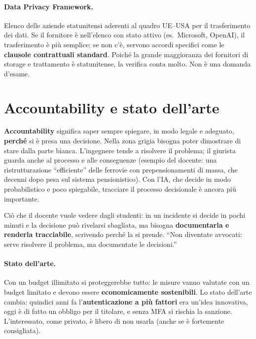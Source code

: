\paragraph{Data Privacy Framework.} Elenco delle aziende statunitensi aderenti al quadro UE--USA per il
trasferimento dei dati. Se il fornitore è nell'elenco con stato attivo (es.\ Microsoft, OpenAI), il
trasferimento è più semplice; se non c'è, servono accordi specifici come le \textbf{clausole
contrattuali standard}. Poiché la grande maggioranza dei fornitori di storage e trattamento è
statunitense, la verifica conta molto. Non è una domanda d'esame.

\section{Accountability e stato dell'arte}
\textbf{Accountability} significa saper sempre spiegare, in modo legale e adeguato, \textbf{perché} si
è presa una decisione. Nella zona grigia bisogna poter dimostrare di stare dalla parte bianca.
L'ingegnere tende a risolvere il problema; il giurista guarda anche al processo e alle conseguenze
(esempio del docente: una ristrutturazione ``efficiente'' delle ferrovie con prepensionamenti di massa,
che decenni dopo pesa sul sistema pensionistico). Con l'IA, che decide in modo probabilistico e poco
spiegabile, tracciare il processo decisionale è ancora più importante.

\begin{esame}
Ciò che il docente vuole vedere dagli studenti: in un incidente si decide in pochi minuti e la
decisione può rivelarsi sbagliata, ma bisogna \textbf{documentarla e renderla tracciabile}, scrivendo
perché la si prende. ``Non diventate avvocati: serve risolvere il problema, ma documentate le
decisioni.''
\end{esame}

\paragraph{Stato dell'arte.} Con un budget illimitato si proteggerebbe tutto: le misure vanno valutate
con un budget limitato e devono essere \textbf{economicamente sostenibili}. Lo stato dell'arte cambia:
quindici anni fa l'\textbf{autenticazione a più fattori} era un'idea innovativa, oggi è di fatto un
obbligo per il titolare, e senza MFA si rischia la sanzione. L'interessato, come privato, è libero di
non usarla (anche se è fortemente consigliata).


